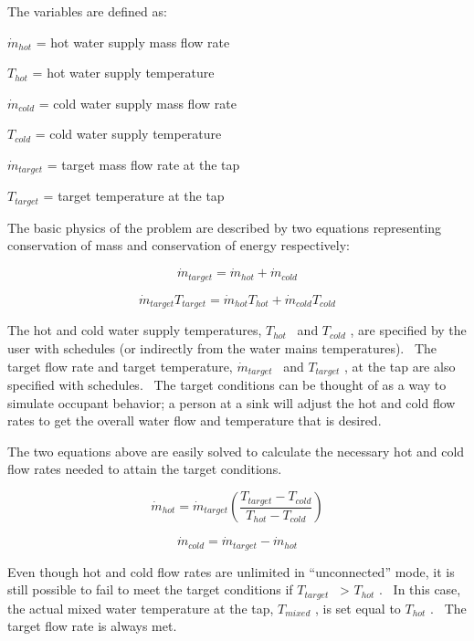 The variables are defined as:

\({\dot m_{hot}}\) = hot water supply mass flow rate

\({T_{hot}}\) = hot water supply temperature

\({\dot m_{cold}}\) = cold water supply mass flow rate

\({T_{cold}}\) = cold water supply temperature

\({\dot m_{target}}\) = target mass flow rate at the tap

\({T_{target}}\) = target temperature at the tap

The basic physics of the problem are described by two equations representing conservation of mass and conservation of energy respectively:

\begin{equation}
{\dot m_{target}} = {\dot m_{hot}} + {\dot m_{cold}}
\end{equation}

\begin{equation}
{\dot m_{target}}{T_{target}} = {\dot m_{hot}}{T_{hot}} + {\dot m_{cold}}{T_{cold}}
\end{equation}

The hot and cold water supply temperatures, \({T_{hot}}\) ~and \({T_{cold}}\) , are specified by the user with schedules (or indirectly from the water mains temperatures).~ The target flow rate and target temperature, \({\dot m_{target}}\) ~and \({T_{target}}\) , at the tap are also specified with schedules.~ The target conditions can be thought of as a way to simulate occupant behavior; a person at a sink will adjust the hot and cold flow rates to get the overall water flow and temperature that is desired.

The two equations above are easily solved to calculate the necessary hot and cold flow rates needed to attain the target conditions.

\begin{equation}
{\dot m_{hot}} = {\dot m_{target}}\left( {\frac{{{T_{target}} - {T_{cold}}}}{{{T_{hot}} - {T_{cold}}}}} \right)
\end{equation}

\begin{equation}
{\dot m_{cold}} = {\dot m_{target}} - {\dot m_{hot}}
\end{equation}

Even though hot and cold flow rates are unlimited in ``unconnected'' mode, it is still possible to fail to meet the target conditions if \({T_{target}}\) ~\textgreater{} \({T_{hot}}\) .~ In this case, the actual mixed water temperature at the tap, \({T_{mixed}}\) , is set equal to \({T_{hot}}\) .~ The target flow rate is always met.

